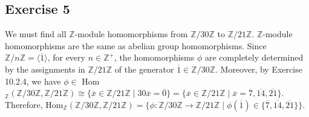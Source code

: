 \subsection*{Exercise 5}
We must find all $\mathbb{Z}$-module homomorphisms from $\mathbb{Z}/30\mathbb{Z}$ to $\mathbb{Z}/21\mathbb{Z}$. $\mathbb{Z}$-module homomorphisms are the same as abelian group homomorphisms. Since $\mathbb{Z}/n\mathbb{Z} = \langle \overline{1} \rangle$, for every $n \in \mathbb{Z}^+$, the homomorphisms $\phi$ are completely determined by the assignments in $\mathbb{Z}/21\mathbb{Z}$ of the generator $\overline{1} \in \mathbb{Z}/30\mathbb{Z}$. Moreover, by Exercise 10.2.4, we have $\phi \in$ Hom$_\mathbb{Z}(\mathbb{Z}/30\mathbb{Z}, \mathbb{Z}/21\mathbb{Z}) \cong \{\overline{x} \in \mathbb{Z}/21\mathbb{Z} \mid 30\overline{x} = \overline{0}\} = \{\overline{x} \in \mathbb{Z}/21\mathbb{Z} \mid \overline{x} = \overline{7},\overline{14},\overline{21}\}$. Therefore, Hom$_\mathbb{Z}(\mathbb{Z}/30\mathbb{Z}, \mathbb{Z}/21\mathbb{Z}) = \{\phi:\mathbb{Z}/30\mathbb{Z} \rightarrow \mathbb{Z}/21\mathbb{Z} \mid \phi(\overline{1}) \in \{\overline{7}, \overline{14}, \overline{21}\}\}$.